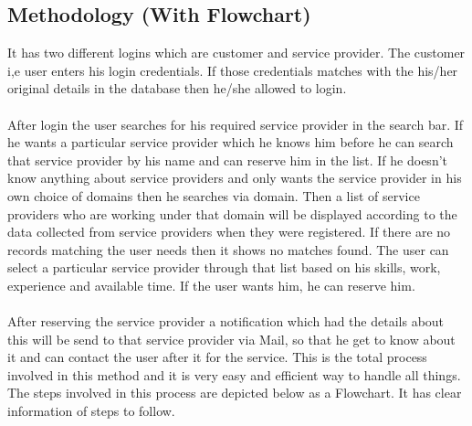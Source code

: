 \documentclass[12pt,a4paper]{report}
\begin{document}
\begin{titlepage}
{\subsection{ Methodology (With Flowchart) }
\vspace{0.5cm}
It has two different logins which are customer and service provider. The customer i,e user enters his login credentials. If those credentials matches with the his/her original details in the database then he/she allowed to login.\\ \\
\vspace{0.20cm}
After login the user searches for his required service provider in the search bar. If he wants a particular service provider which he knows him before he can search that service provider by his name and can reserve him in the list. If he doesn't know anything about service providers and only wants the service provider in his own choice of domains then he searches via domain. Then a list of service providers who are working under that domain will be displayed according to the data collected from service providers when they were registered. If there are no records matching the user needs then it shows no matches found. The user can select a particular service provider through that list based on his skills, work, experience and available time. If the user wants him, he can reserve him.\\ \\ After reserving the service provider a notification which had the details about this will be send to that service provider via Mail, so that he get to know about it and can contact the user after it for the service. This is the total process involved in this method and it is very easy and efficient way to handle all things.\\
\vspace{0.20cm}
The steps involved in this process are depicted below as a Flowchart. It has clear information of steps to follow.\\
\begin{figure}[h!]
	\begin{center}

\end{center}
\end{figure}}
\end{titlepage}
\end{document}
